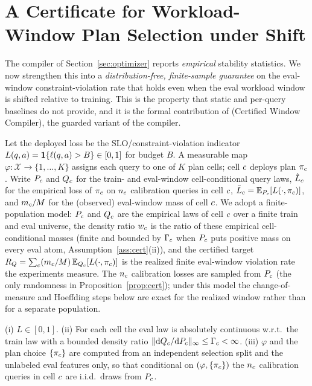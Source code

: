 \section{A Certificate for Workload-Window Plan Selection under Shift}
\label{sec:certificate}

The compiler of Section~\ref{sec:optimizer} reports \emph{empirical} stability statistics. We now strengthen this into a \emph{distribution-free, finite-sample guarantee} on the eval-window constraint-violation rate that holds even when the eval workload window is shifted relative to training. This is the property that static and per-query baselines do not provide, and it is the formal contribution of \CWC{} (Certified Window Compiler), the guarded variant of the compiler.

Let the deployed loss be the SLO/constraint-violation indicator $L(q,a)=\mathbf{1}\{\ell(q,a)>B\}\in[0,1]$ for budget $B$. A measurable map $\varphi:\mathcal X\to\{1,\dots,K\}$ assigns each query to one of $K$ plan cells; cell $c$ deploys plan $\pi_c$. Write $P_c$ and $Q_c$ for the train- and eval-window cell-conditional query laws, $\hat L_c$ for the empirical loss of $\pi_c$ on $n_c$ calibration queries in cell $c$, $\bar L_c=\mathbb{E}_{P_c}[L(\cdot,\pi_c)]$, and $m_c/M$ for the (observed) eval-window mass of cell $c$. We adopt a finite-population model: $P_c$ and $Q_c$ are the empirical laws of cell $c$ over a finite train and eval universe, the density ratio $w_c$ is the ratio of these empirical cell-conditional masses (finite and bounded by $\Gamma_c$ when $P_c$ puts positive mass on every eval atom, Assumption~\ref{ass:cert}(ii)), and the certified target $R_Q=\sum_{c} (m_c/M)\,\mathbb{E}_{Q_c}[L(\cdot,\pi_c)]$ is the realized finite eval-window violation rate the experiments measure. The $n_c$ calibration losses are sampled from $P_c$ (the only randomness in Proposition~\ref{prop:cert}); under this model the change-of-measure and Hoeffding steps below are exact for the realized window rather than for a separate population.

\begin{assumption}
\label{ass:cert}
(i) $L\in[0,1]$. (ii) For each cell the eval law is absolutely continuous w.r.t.\ the train law with a bounded density ratio $\lVert \mathrm dQ_c/\mathrm dP_c\rVert_\infty\le \Gamma_c<\infty$. (iii) $\varphi$ and the plan choice $\{\pi_c\}$ are computed from an independent selection split and the unlabeled eval features only, so that conditional on $(\varphi,\{\pi_c\})$ the $n_c$ calibration queries in cell $c$ are i.i.d.\ draws from $P_c$.
\end{assumption}

